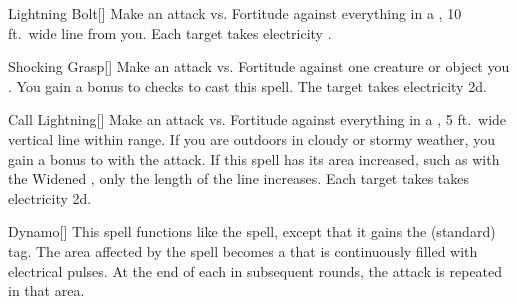 \lowercase{\hypertarget{spell:Lightning Bolt}{}}\label{spell:Lightning Bolt}
\begin{apability}[\nth{1}]{\hypertarget{spell:Lightning Bolt}{Lightning Bolt}}[]
Make an attack vs. Fortitude against everything in a \arealarge, 10 ft.\ wide line from you.
\hit Each target takes electricity .
\end{apability}
\vspace{0.25em}



\lowercase{\hypertarget{spell:Shocking Grasp}{}}\label{spell:Shocking Grasp}
\begin{apability}[\nth{1}]{\hypertarget{spell:Shocking Grasp}{Shocking Grasp}}[]
Make an attack vs. Fortitude against one creature or object you .
You gain a  bonus to  checks to cast this spell.
\hit The target takes electricity  \plus2d.
\end{apability}
\vspace{0.25em}



\lowercase{\hypertarget{spell:Call Lightning}{}}\label{spell:Call Lightning}
\begin{apability}[\nth{2}]{\hypertarget{spell:Call Lightning}{Call Lightning}}[]
Make an attack vs. Fortitude against everything in a \arealarge, 5 ft.\ wide vertical line within \rngmed range.
If you are outdoors in cloudy or stormy weather, you gain a  bonus to  with the attack.
If this spell has its area increased, such as with the Widened , only the length of the line increases.
\hit Each target takes takes electricity  \plus2d.
\end{apability}
\vspace{0.25em}



\lowercase{\hypertarget{spell:Dynamo}{}}\label{spell:Dynamo}
\begin{apability}[\nth{2}]{\hypertarget{spell:Dynamo}{Dynamo}}[]
This spell functions like the  spell, except that it gains the  (standard) tag.
The area affected by the spell becomes a  that is continuously filled with electrical pulses.
At the end of each  in subsequent rounds, the attack is repeated in that area.
\end{apability}
\vspace{0.25em}



